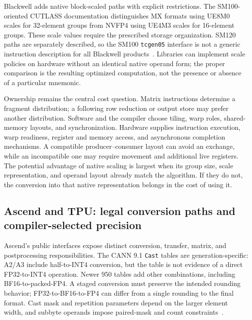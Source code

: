 Blackwell adds native block-scaled paths with explicit restrictions. The SM100-oriented CUTLASS documentation distinguishes MX formats using UE8M0 scales for 32-element groups from NVFP4 using UE4M3 scales for 16-element groups. These scale values require the prescribed storage organization. SM120 paths are separately described, so the SM100 \texttt{tcgen05} interface is not a generic instruction description for all Blackwell products~\citep{u003_cutlass_blackwell}. Libraries can implement scale policies on hardware without an identical native operand form; the proper comparison is the resulting optimized computation, not the presence or absence of a particular mnemonic.

Ownership remains the central cost question. Matrix instructions determine a fragment distribution; a following row reduction or output store may prefer another distribution. Software and the compiler choose tiling, warp roles, shared-memory layouts, and synchronization. Hardware supplies instruction execution, warp readiness, register and memory access, and asynchronous completion mechanisms. A compatible producer--consumer layout can avoid an exchange, while an incompatible one may require movement and additional live registers. The potential advantage of native scaling is largest when its group size, scale representation, and operand layout already match the algorithm. If they do not, the conversion into that native representation belongs in the cost of using it.

\subsection{Ascend and TPU: legal conversion paths and compiler-selected precision}

Ascend's public interfaces expose distinct conversion, transfer, matrix, and postprocessing responsibilities. The CANN 9.1 \texttt{Cast} tables are generation-specific: A2/A3 include half-to-INT4 conversion, but the table is not evidence of a direct FP32-to-INT4 operation. Newer 950 tables add other combinations, including BF16-to-packed-FP4. A staged conversion must preserve the intended rounding behavior; FP32-to-BF16-to-FP4 can differ from a single rounding to the final format. Cast mask and repetition parameters depend on the larger element width, and subbyte operands impose paired-mask and count constraints~\citep{u003_ascend_cast}.

